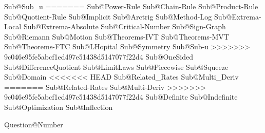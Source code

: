 Sub@Sub_u					%
=======
Sub@Power-Rule				%
Sub@Chain-Rule				%
Sub@Product-Rule			%
Sub@Quotient-Rule			%
Sub@Implicit				%
Sub@Arctrig					%
Sub@Method-Log				%
Sub@Extrema-Local			%
Sub@Extrema-Absolute		%
Sub@Critical-Number			%
Sub@Sign-Graph				%
Sub@Riemann					%
Sub@Motion					%
Sub@Theorems-IVT			%
Sub@Theorems-MVT			%
Sub@Theorems-FTC			%
Sub@LHopital				%
Sub@Symmetry				%
Sub@Sub-u					%
>>>>>>> 9c046e95fe5abcf1ed497e51438d5147077f22d4
Sub@OneSided				%
Sub@DifferenceQuotient		%
Sub@LimitLaws				%
Sub@Piecewise				%
Sub@Squeeze					%
Sub@Domain					%
<<<<<<< HEAD
Sub@Related_Rates			%
Sub@Multi_Deriv				%
=======
Sub@Related-Rates			%
Sub@Multi-Deriv				%
>>>>>>> 9c046e95fe5abcf1ed497e51438d5147077f22d4
Sub@Definite				%
Sub@Indefinite				%
Sub@Optimization			%
Sub@Inflection				%







Question@Number %




